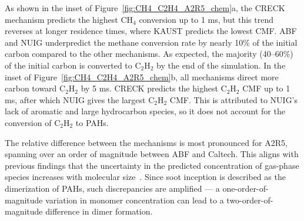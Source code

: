 As shown in the inset of Figure~\ref{fig:CH4_C2H4_A2R5_chem}a, the CRECK mechanism predicts the highest $\mathrm{CH_4}$ conversion up to 1 ms, but this trend reverses at longer residence times, where KAUST predicts the lowest CMF. ABF and NUIG underpredict the methane conversion rate by nearly 10\% of the initial carbon compared to the other mechanisms. As expected, the majority (40–60\%) of the initial carbon is converted to $\mathrm{C_2H_2}$ by the end of the simulation. In the inset of Figure~\ref{fig:CH4_C2H4_A2R5_chem}b, all mechanisms direct more carbon toward $\mathrm{C_2H_2}$ by 5 ms. CRECK predicts the highest $\mathrm{C_2H_2}$ CMF up to 1 ms, after which NUIG gives the largest $\mathrm{C_2H_2}$ CMF. This is attributed to NUIG’s lack of aromatic and large hydrocarbon species, so it does not account for the conversion of $\mathrm{C_2H_2}$ to PAHs.

The relative difference between the mechanisms is most pronounced for A2R5, spanning over an order of magnitude between ABF and Caltech. This aligns with previous findings that the uncertainty in the predicted concentration of gas-phase species increases with molecular size~\cite{wang2023systematic}. Since soot inception is described as the dimerization of PAHs, such discrepancies are amplified — a one-order-of-magnitude variation in monomer concentration can lead to a two-order-of-magnitude difference in dimer formation.
 

